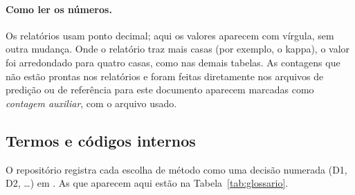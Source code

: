\documentclass[11pt,a4paper]{article}
\begin{document}
\paragraph{Como ler os números.} Os relatórios usam ponto decimal; aqui os valores aparecem com vírgula, sem outra mudança. Onde o relatório traz mais casas (por exemplo, o kappa), o valor foi arredondado para quatro casas, como nas demais tabelas. As contagens que não estão prontas nos relatórios e foram feitas diretamente nos arquivos de predição ou de referência para este documento aparecem marcadas como \emph{contagem auxiliar}, com o arquivo usado.

\subsection{Termos e códigos internos}

O repositório registra cada escolha de método como uma decisão numerada (D1, D2, \ldots) em . As que aparecem aqui estão na Tabela~\ref{tab:glossario}.
\end{document}
